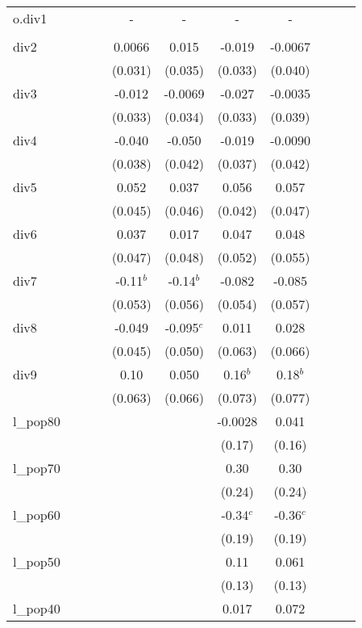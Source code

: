 \documentclass[]{article}
\begin{document}
\begin{tabular}{lcccccccccc}
o.div1 &  &  &  & - & - & - & - &  &  &  \\
 &  &  &  &  &  &  &  &  &  &  \\
div2 &  &  &  & 0.0066 & 0.015 & -0.019 & -0.0067 &  &  &  \\
 &  &  &  & (0.031) & (0.035) & (0.033) & (0.040) &  &  &  \\
div3 &  &  &  & -0.012 & -0.0069 & -0.027 & -0.0035 &  &  &  \\
 &  &  &  & (0.033) & (0.034) & (0.033) & (0.039) &  &  &  \\
div4 &  &  &  & -0.040 & -0.050 & -0.019 & -0.0090 &  &  &  \\
 &  &  &  & (0.038) & (0.042) & (0.037) & (0.042) &  &  &  \\
div5 &  &  &  & 0.052 & 0.037 & 0.056 & 0.057 &  &  &  \\
 &  &  &  & (0.045) & (0.046) & (0.042) & (0.047) &  &  &  \\
div6 &  &  &  & 0.037 & 0.017 & 0.047 & 0.048 &  &  &  \\
 &  &  &  & (0.047) & (0.048) & (0.052) & (0.055) &  &  &  \\
div7 &  &  &  & -0.11$^b$ & -0.14$^b$ & -0.082 & -0.085 &  &  &  \\
 &  &  &  & (0.053) & (0.056) & (0.054) & (0.057) &  &  &  \\
div8 &  &  &  & -0.049 & -0.095$^c$ & 0.011 & 0.028 &  &  &  \\
 &  &  &  & (0.045) & (0.050) & (0.063) & (0.066) &  &  &  \\
div9 &  &  &  & 0.10 & 0.050 & 0.16$^b$ & 0.18$^b$ &  &  &  \\
 &  &  &  & (0.063) & (0.066) & (0.073) & (0.077) &  &  &  \\
l\_pop80 &  &  &  &  &  & -0.0028 & 0.041 &  &  &  \\
 &  &  &  &  &  & (0.17) & (0.16) &  &  &  \\
l\_pop70 &  &  &  &  &  & 0.30 & 0.30 &  &  &  \\
 &  &  &  &  &  & (0.24) & (0.24) &  &  &  \\
l\_pop60 &  &  &  &  &  & -0.34$^c$ & -0.36$^c$ &  &  &  \\
 &  &  &  &  &  & (0.19) & (0.19) &  &  &  \\
l\_pop50 &  &  &  &  &  & 0.11 & 0.061 &  &  &  \\
 &  &  &  &  &  & (0.13) & (0.13) &  &  &  \\
l\_pop40 &  &  &  &  &  & 0.017 & 0.072 &  &  &  \\

\end{tabular}
\end{document}
